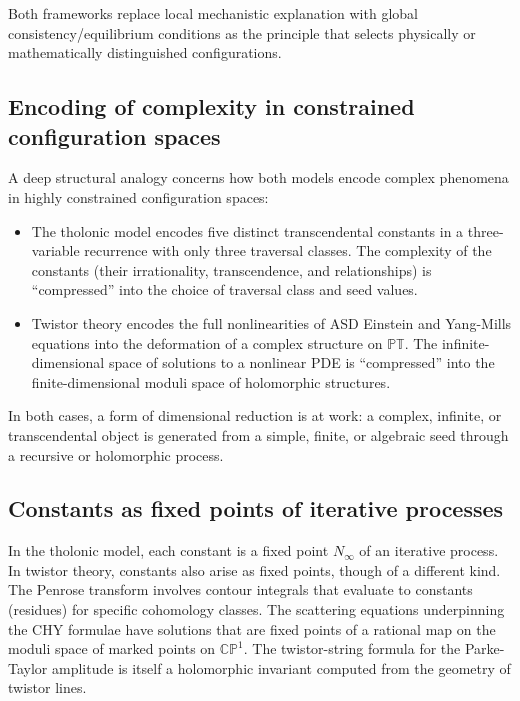 \documentclass[12pt]{article}
\begin{document}
Both frameworks replace local mechanistic explanation with global
consistency/equilibrium conditions as the principle that selects physically or
mathematically distinguished configurations.

\subsection{Encoding of complexity in constrained configuration spaces}\label{sec:encoding}

A deep structural analogy concerns how both models encode complex phenomena in highly
constrained configuration spaces:
\begin{itemize}
  \item The tholonic model encodes five distinct transcendental constants in a
        three-variable recurrence with only three traversal classes.  The complexity of
        the constants (their irrationality, transcendence, and relationships) is
        ``compressed'' into the choice of traversal class and seed values.
  \item Twistor theory encodes the full nonlinearities of ASD Einstein and Yang-Mills
        equations into the deformation of a complex structure on $\mathbb{PT}$.  The
        infinite-dimensional space of solutions to a nonlinear PDE is ``compressed'' into
        the finite-dimensional moduli space of holomorphic structures.
\end{itemize}
In both cases, a form of dimensional reduction is at work: a complex, infinite, or
transcendental object is generated from a simple, finite, or algebraic seed through a
recursive or holomorphic process.

\subsection{Constants as fixed points of iterative processes}\label{sec:fixed-points}

In the tholonic model, each constant is a fixed point $N_\infty$ of an iterative
process.  In twistor theory, constants also arise as fixed points, though of a different
kind.  The Penrose transform involves contour integrals that evaluate to constants
(residues) for specific cohomology classes.  The scattering equations underpinning the
CHY formulae \cite[Section~7c]{ADM17} have solutions that are fixed points of a rational
map on the moduli space of marked points on $\mathbb{CP}^1$.  The twistor-string formula
for the Parke-Taylor amplitude \cite[Eq.~7.1]{ADM17} is itself a holomorphic invariant
computed from the geometry of twistor lines.
\end{document}
